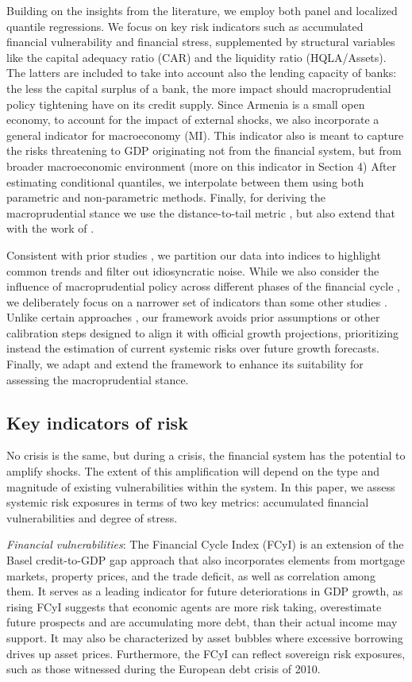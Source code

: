 \documentclass[12pt,a4paper]{article}
\begin{document}
Building on the insights from the literature, we employ both panel and localized quantile regressions. We focus on key risk indicators such as accumulated financial vulnerability and financial stress, supplemented by structural variables like the capital adequacy ratio (CAR) and the liquidity ratio (HQLA/Assets). The latters are included to take into account also the lending capacity of banks: the less the capital surplus of a bank, the more impact should macroprudential policy tightening have on its credit supply. Since Armenia is a small open economy, to account for the impact of external shocks, we also incorporate a general indicator for macroeconomy (MI). This indicator also is meant to capture the risks threatening to GDP originating not from the financial system, but from broader macroeconomic environment (more on this indicator in Section 4) After estimating conditional quantiles, we interpolate between them using both parametric and non-parametric methods. Finally, for deriving the macroprudential stance we use the distance-to-tail metric \citep{esrb2024}, but also extend that with the work of \citet{suarez2022}.

Consistent with prior studies \citep{imf_gar_2019}, we partition our data into indices to highlight common trends and filter out idiosyncratic noise. While we also consider the influence of macroprudential policy across different phases of the financial cycle \citep{galan2020}, we deliberately focus on a narrower set of indicators than some other studies \citep{aikman2019}. Unlike certain approaches \citep{szabo2020}, our framework avoids prior assumptions or other calibration steps designed to align it with official growth projections, prioritizing instead the estimation of current systemic risks over future growth forecasts.  Finally, we adapt and extend the framework to enhance its suitability for assessing the macroprudential stance.

\subsection{Key indicators of risk}
No crisis is the same, but during a crisis, the financial system has the potential to amplify shocks. The extent of this amplification will depend on the type and magnitude of existing vulnerabilities within the system. In this paper, we assess systemic risk exposures in terms of two key metrics: accumulated financial vulnerabilities and degree of stress.

\textit{Financial vulnerabilities}: The Financial Cycle Index (FCyI) \citep{hollo2012, plasil2014} is an extension of the Basel credit-to-GDP gap approach \citep{basel2010} that also incorporates elements from mortgage markets, property prices, and the trade deficit, as well as correlation among them. It serves as a leading indicator for future deteriorations in GDP growth, as rising FCyI suggests that economic agents are more risk taking, overestimate future prospects and are accumulating more debt, than their actual income may support. It may also be characterized by asset bubbles where excessive borrowing drives up asset prices. Furthermore, the FCyI can reflect sovereign risk exposures, such as those witnessed during the European debt crisis of 2010.
\end{document}

